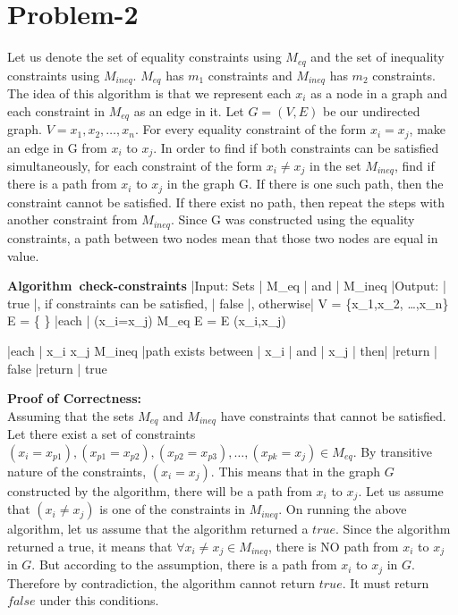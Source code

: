 \documentclass{article}
\begin{document}
\section{Problem-2}
Let us denote the set of equality constraints using $M_{eq}$ and the set of inequality constraints using $M_{ineq}$. $M_{eq}$ has $m_{1}$ constraints and $M_{ineq}$ has $m_{2}$ constraints. The idea of this algorithm is that we represent each $x_{i}$ as a node in a graph and each constraint in $M_{eq}$ as an edge in it. Let $G=(V,E)$ be our undirected graph. $V = {x_{1},x_{2},\ldots,x_{n}}$. For every equality constraint of the form $x_{i}=x_{j}$, make an edge in G from $x_{i}$ to $x_{j}$. In order to find if both constraints can be satisfied simultaneously, for each constraint of the form $x_{i} \neq x_{j}$ in the set $M_{ineq}$, find if there is a path from $x_{i}$ to $x_{j}$ in the graph G. If there is one such path, then the constraint cannot be satisfied. If there exist no path, then repeat the steps with another constraint from $M_{ineq}$.  Since G was constructed using the equality constraints, a path between two nodes mean that those two nodes are equal in value. 

\NumberProgramstrue
\begin{program}
\mbox{\textbf{Algorithm check-constraints}}
|Input: Sets | M_{eq} | and | M_{ineq}
|Output: | true |, if constraints can be satisfied, | false |, otherwise|
\BEGIN
	V = \{x_{1},x_{2}, \ldots,x_{n}\}
	E = \{ \}
	\FOR |each | (x_{i}=x_{j}) \in  M_{eq} \DO
		E = E \union (x_{i},x_{j})
	\OD

	\FOR |each | x_{i} \neq x_{j} \in M_{ineq} \DO
		\IF |path exists between | x_{i} | and | x_{j} | then|
			|return | false 
		\FI
	\OD
	|return | true 
\END
\end{program}

\noindent \textbf{Proof of Correctness:} \\
Assuming that the sets  $M_{eq}$ and $M_{ineq}$ have constraints that cannot be satisfied. Let there exist a set of constraints $(x_{i}=x_{p1}),(x_{p1}=x_{p2}),(x_{p2}=x_{p3}),\ldots,(x_{pk}=x_{j}) \in M_{eq}$. By transitive nature of the constraints, $(x_{i}=x_{j})$. This means that in the graph $G$ constructed by the algorithm, there will be a path from $x_{i}$ to $x_{j}$. Let us assume that $(x_{i} \neq x_{j})$ is one of the constraints in $M_{ineq}$. On running the above algorithm, let us assume that the algorithm returned a $true$. Since the algorithm returned a true, it means that $ \forall x_{i} \neq x_{j} \in M_{ineq}$, there is NO path from $x_{i}$ to $x_{j}$ in $G$. But according to the assumption, there is a path from $x_{i}$ to $x_{j}$ in $G$. Therefore by contradiction, the algorithm cannot return $true$. It must return $false$ under this conditions.
\end{document}
